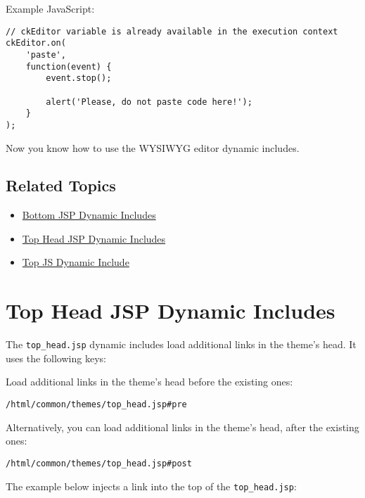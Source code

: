 Example JavaScript:

\begin{verbatim}
// ckEditor variable is already available in the execution context
ckEditor.on(
    'paste',
    function(event) {
        event.stop();

        alert('Please, do not paste code here!');
    }
);
\end{verbatim}

Now you know how to use the WYSIWYG editor dynamic includes.

\section{Related Topics}\label{related-topics-20}

\begin{itemize}
\tightlist
\item
  \href{/docs/7-2/customization/-/knowledge_base/c/bottom-jsp-dynamic-includes}{Bottom
  JSP Dynamic Includes}
\item
  \href{/docs/7-2/customization/-/knowledge_base/c/top-head-jsp-dynamic-includes}{Top
  Head JSP Dynamic Includes}
\item
  \href{/docs/7-2/customization/-/knowledge_base/c/top-js-dynamic-include}{Top
  JS Dynamic Include}
\end{itemize}

\chapter{Top Head JSP Dynamic
Includes}\label{top-head-jsp-dynamic-includes}

The \texttt{top\_head.jsp} dynamic includes load additional links in the
theme's head. It uses the following keys:

Load additional links in the theme's head before the existing ones:

\begin{verbatim}
/html/common/themes/top_head.jsp#pre
\end{verbatim}

Alternatively, you can load additional links in the theme's head, after
the existing ones:

\begin{verbatim}
/html/common/themes/top_head.jsp#post
\end{verbatim}

The example below injects a link into the top of the
\texttt{top\_head.jsp}:

